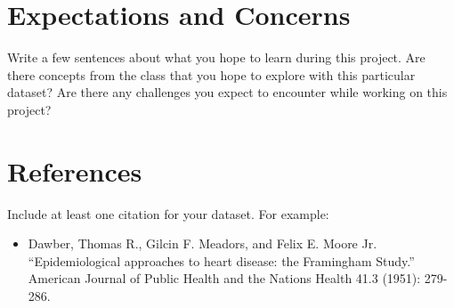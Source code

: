 \documentclass[12pt]{article}
\begin{document}
\section{Expectations and Concerns}

Write a few sentences about what you hope to learn during this project. Are
there concepts from the class that you hope to explore with this particular
dataset? Are there any challenges you expect to encounter while working on this
project?

\section{References}

Include at least one citation for your dataset. For example:

\begin{itemize}
\item Dawber, Thomas R., Gilcin F. Meadors, and Felix E. Moore Jr. ``Epidemiological
approaches to heart disease: the Framingham Study.'' American Journal of Public
Health and the Nations Health 41.3 (1951): 279-286.
\end{itemize}
\end{document}

